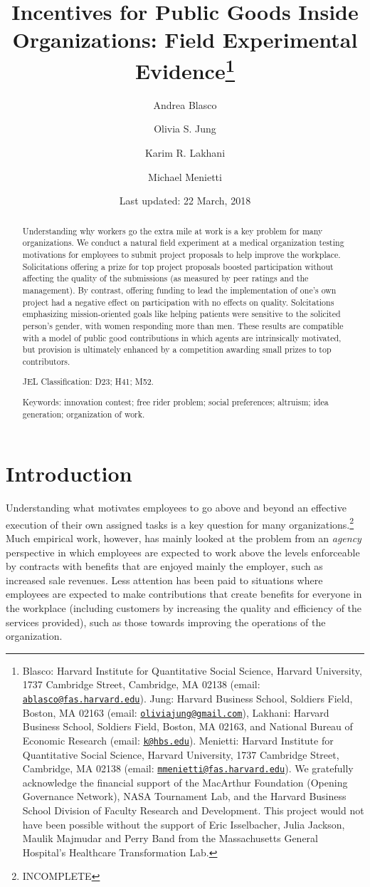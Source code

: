 \documentclass[11pt]{article}
\title{\textbf{Incentives for Public Goods Inside Organizations: Field Experimental Evidence}\thanks{Blasco: Harvard Institute for Quantitative Social Science, Harvard
University, 1737 Cambridge Street, Cambridge, MA 02138 (email:
\href{mailto:ablasco@fas.harvard.edu}{\nolinkurl{ablasco@fas.harvard.edu}}).
Jung: Harvard Business School, Soldiers Field, Boston, MA 02163 (email:
\href{mailto:oliviajung@gmail.com}{\nolinkurl{oliviajung@gmail.com}}),
Lakhani: Harvard Business School, Soldiers Field, Boston, MA 02163, and
National Bureau of Economic Research (email:
\href{mailto:k@hbs.edu}{\nolinkurl{k@hbs.edu}}). Menietti: Harvard
Institute for Quantitative Social Science, Harvard University, 1737
Cambridge Street, Cambridge, MA 02138 (email:
\href{mailto:mmenietti@fas.harvard.edu}{\nolinkurl{mmenietti@fas.harvard.edu}}).
We gratefully acknowledge the financial support of the MacArthur
Foundation (Opening Governance Network), NASA Tournament Lab, and the
Harvard Business School Division of Faculty Research and Development.
This project would not have been possible without the support of Eric
Isselbacher, Julia Jackson, Maulik Majmudar and Perry Band from the
Massachusetts General Hospital's Healthcare Transformation Lab.}}
\author{Andrea Blasco\and Olivia S. Jung\and Karim R. Lakhani\and Michael Menietti}
\date{Last updated: 22 March, 2018}
\begin{document}
\maketitle
\begin{abstract}
Understanding why workers go the extra mile at work is a key problem for
many organizations. We conduct a natural field experiment at a medical
organization testing motivations for employees to submit project
proposals to help improve the workplace. Solicitations offering a prize
for top project proposals boosted participation without affecting the
quality of the submissions (as measured by peer ratings and the
management). By contrast, offering funding to lead the implementation of
one's own project had a negative effect on participation with no effects
on quality. Solcitations emphasizing mission-oriented goals like helping
patients were sensitive to the solicited person's gender, with women
responding more than men. These results are compatible with a model of
public good contributions in which agents are intrinsically motivated,
but provision is ultimately enhanced by a competition awarding small
prizes to top contributors.

\smallskip\noindent 
JEL Classification: D23; H41; M52.

\smallskip\noindent 
Keywords: innovation contest; free rider problem; social preferences; altruism; idea generation; organization of work.
\end{abstract}


\clearpage
\tableofcontents
\setcounter{tocdepth}{2}
\clearpage

\section{Introduction}\label{introduction}

Understanding what motivates employees to go above and beyond an
effective execution of their own assigned tasks is a key question for
many organizations.\footnote{INCOMPLETE} Much empirical work, however,
has mainly looked at the problem from an \emph{agency} perspective in
which employees are expected to work above the levels enforceable by
contracts with benefits that are enjoyed mainly the employer, such as
increased sale revenues. Less attention has been paid to situations
where employees are expected to make contributions that create benefits
for everyone in the workplace (including customers by increasing the
quality and efficiency of the services provided), such as those towards
improving the operations of the organization.
\end{document}

